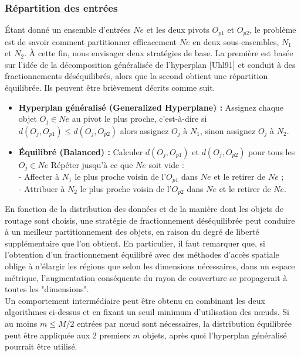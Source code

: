 \subsubsection{Répartition des entrées}
Étant donné un ensemble d'entrées $ Ne $ et les deux pivots $ O_{p1} $ et $ O_{p2} $, le problème est de savoir comment partitionner efficacement $ Ne $ en deux sous-ensembles, $  N_1 $ et $ N_2 $. À cette fin, nous envisager deux stratégies de base. La première est basée sur l'idée de la décomposition généralisée de l'hyperplan [Uhl91] et conduit à des fractionnements déséquilibrés, alors que la second obtient une répartition équilibrée. Ils peuvent être brièvement décrits comme suit.
\begin{itemize}
	\item \textbf{Hyperplan généralisé (Generalized Hyperplane) :} Assignez chaque objet $ O_j \in Ne $ au  pivot le plus proche, c'est-à-dire si $ d(O_j, O_{p1}) \le d(O_j, O_{p2}) $ alors assignez $ O_j $ à $ N_1 $, sinon assignez $ O_j $ à $ N_2 $.
	
	\item \textbf{Équilibré (Balanced) :} Calculer $ d(O_j, O_{p1}) $ et $ d(O_j, O_{p2}) $ pour tous les $ O_j \in Ne $ Répéter jusqu'à ce que $ Ne $ soit vide :\\
	 - Affecter à $ N_1 $ le plus proche voisin de l'$ O_{p1} $ dans $ Ne $ et le retirer de $ Ne $ ;\\
	 - Attribuer à $ N_2 $ le plus proche voisin de l'$ O_{p2} $ dans $ Ne $ et le retirer de $ Ne $.
\end{itemize}
En fonction de la distribution des données et de la manière dont les objets de routage sont choisis, une stratégie de fractionnement déséquilibrée peut conduire à un meilleur partitionnement des objets, en raison du degré de liberté supplémentaire que l'on obtient. En particulier, il faut remarquer que, si l'obtention d'un fractionnement équilibré avec des méthodes d'accès spatiale oblige à n'élargir les régions que selon les dimensions nécessaires, dans un espace métrique, l'augmentation conséquente du rayon de couverture se propagerait à toutes les "dimensions".\\

Un comportement intermédiaire peut être obtenu en combinant les deux algorithmes ci-dessus et en fixant un seuil minimum d'utilisation des nœuds. Si au moins $ m \le M/2 $ entrées par nœud sont nécessaires, la distribution équilibrée peut être appliquée aux 2 premiers $ m $ objets, après quoi l'hyperplan généralisé pourrait être utilisé. 

